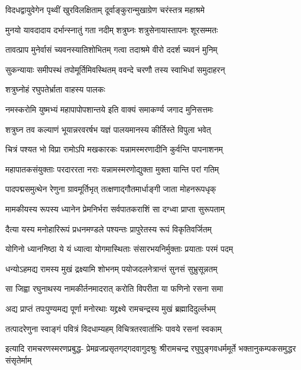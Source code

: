 \twolineshloka
{विदधद्वायुवेगेन पृथ्वीं खुरविलक्षिताम्}
{दूर्वाङ्कुरान्मुखाग्रेण चरंस्तत्र महाश्रमे}%

\twolineshloka
{मुनयो यावदादाय दर्भान्स्नातुं गता नदीम्}
{शत्रुघ्नः शत्रुसेनायास्तापनः शूरसम्मतः}%

\twolineshloka
{तावत्प्राप मुनेर्वासं च्यवनस्यातिशोभितम्}
{गत्वा तदाश्रमे वीरो ददर्श च्यवनं मुनिम्}%

\twolineshloka
{सुकन्यायाः समीपस्थं तपोमूर्तिमिवस्थितम्}
{ववन्दे चरणौ तस्य स्वाभिधां समुदाहरन्}%

\onelineshloka
{शत्रुघ्नोहं रघुपतेर्भ्राता वाहस्य पालकः}%

\twolineshloka
{नमस्करोमि युष्मभ्यं महापापोपशान्तये}
{इति वाक्यं समाकर्ण्य जगाद मुनिसत्तमः}%

\twolineshloka
{शत्रुघ्न तव कल्याणं भूयान्नरवरर्षभ}
{यज्ञं पालयमानस्य कीर्तिस्ते विपुला भवेत्}%

\twolineshloka
{चित्रं पश्यत भो विप्रा रामोऽपि मखकारकः}
{यन्नामस्मरणादीनि कुर्वन्ति पापनाशनम्}%

\twolineshloka
{महापातकसंयुक्ताः परदाररता नराः}
{यन्नामस्मरणोद्युक्ता मुक्ता यान्ति परां गतिम्}%

\twolineshloka
{पादपद्मसमुत्थेन रेणुना ग्रावमूर्तिभृत्}
{तत्क्षणाद्गौतमार्धाङ्गी जाता मोहनरूपधृक्}%

\twolineshloka
{मामकीयस्य रूपस्य ध्यानेन प्रेमनिर्भरा}
{सर्वपातकराशिं सा दग्ध्वा प्राप्ता सुरूपताम्}%

\twolineshloka
{दैत्या यस्य मनोहारिरूपं प्रधनमण्डले}
{पश्यन्तः प्रापुरेतस्य रूपं विकृतिवर्जितम्}%

\twolineshloka
{योगिनो ध्याननिष्ठा ये यं ध्यात्वा योगमास्थिताः}
{संसारभयनिर्मुक्ताः प्रयाताः परमं पदम्}%

\twolineshloka
{धन्योऽहमद्य रामस्य मुखं द्रक्ष्यामि शोभनम्}
{पयोजदलनेत्रान्तं सुनसं सुभ्रुसून्नतम्}%

\twolineshloka
{सा जिह्वा रघुनाथस्य नामकीर्तनमादरात्}
{करोति विपरीता या फणिनो रसना समा}%

\twolineshloka
{अद्य प्राप्तं तपःपुण्यमद्य पूर्णा मनोरथाः}
{यद्द्रक्ष्ये रामचन्द्रस्य मुखं ब्रह्मादिदुर्ल्लभम्}%

\twolineshloka
{तत्पादरेणुना स्वाङ्गं पवित्रं विदधाम्यहम्}
{विचित्रतरवार्ताभिः पावये रसनां स्वकाम्}%

\fourlineindentedshloka
{इत्यादि रामचरणस्मरणप्रबुद्ध-}
{प्रेमव्रजप्रसृतगद्गदवागुदश्रुः}
{श्रीरामचन्द्र रघुपुङ्गवधर्ममूर्ते}
{भक्तानुकम्पकसमुद्धर संसृतेर्माम्}%


